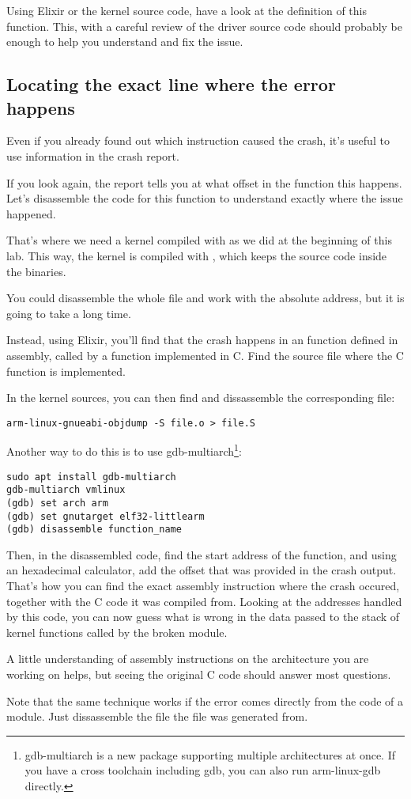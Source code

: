 Using Elixir or the kernel source code, have a look at the definition of this
function. This, with a careful review of the driver source code should
probably be enough to help you understand and fix the issue.

\subsection{Locating the exact line where the error happens}

Even if you already found out which instruction caused the crash, it's
useful to use information in the crash report.

If you look again, the report tells you at what offset in the function
this happens. Let's disassemble the code for this function to
understand exactly where the issue happened.

That's where we need a kernel compiled with 
as we did at the beginning of this lab. This way, the kernel is
compiled with , which keeps the source
code inside the binaries.

You could disassemble the whole  file and work with
the  absolute address, but it is going to take a long time.

Instead, using Elixir, you'll find that the crash happens in an function
defined in assembly, called by a function implemented in C. Find
the  source file where the C function is implemented.

In the kernel sources, you can then find
and dissassemble the corresponding  file:

\begin{verbatim}
arm-linux-gnueabi-objdump -S file.o > file.S
\end{verbatim}

Another way to do this is to use {gdb-multiarch}\footnote{gdb-multiarch is a new package
supporting multiple architectures at once. If you have a cross
toolchain including gdb, you can also run arm-linux-gdb directly.}:

\begin{verbatim}
sudo apt install gdb-multiarch
gdb-multiarch vmlinux
(gdb) set arch arm
(gdb) set gnutarget elf32-littlearm
(gdb) disassemble function_name
\end{verbatim}

Then, in the disassembled code, find the start address of the
function, and using an hexadecimal calculator, add the offset that
was provided in the crash output. That's how you can find the
exact assembly instruction where the crash occured, together
with the C code it was compiled from. Looking at the addresses
handled by this code, you can now guess what is wrong in the
data passed to the stack of kernel functions called by the
broken module.

A little understanding of assembly instructions on the architecture
you are working on helps, but seeing the original C code should answer
most questions.

Note that the same technique works if the error comes directly from
the code of a module. Just dissassemble the  file
the  file was generated from.
